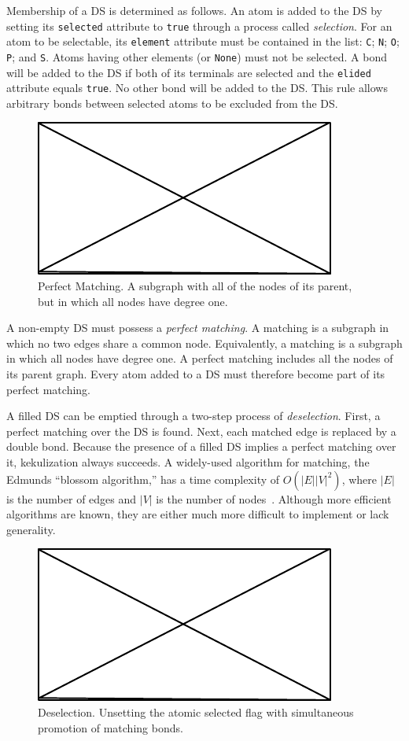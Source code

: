 \documentclass{article}
\def\ttt{\texttt}
\begin{document}
Membership of a DS is determined as follows. An atom is added to the DS by setting its \ttt{selected} attribute to \ttt{true} through a process called \textit{selection}. For an atom to be selectable, its \ttt{element} attribute must be contained in the list: \ttt{C}; \ttt{N}; \ttt{O}; \ttt{P}; and \ttt{S}. Atoms having other elements (or \ttt{None}) must not be selected. A bond will be added to the DS if both of its terminals are selected and the \ttt{elided} attribute equals \ttt{true}. No other bond will be added to the DS. This rule allows arbitrary bonds between selected atoms to be excluded from the DS.

\begin{figure}
    \centering
    \includegraphics{filler}
    \caption{Perfect Matching. A subgraph with all of the nodes of its parent, but in which all nodes have degree one.}
    \label{fig:perfect-matching}
\end{figure}

A non-empty DS must possess a \textit{perfect matching}. A matching is a subgraph in which no two edges share a common node. Equivalently, a matching is a subgraph in which all nodes have degree one. A perfect matching includes all the nodes of its parent graph. Every atom added to a DS must therefore become part of its perfect matching.

A filled DS can be emptied through a two-step process of \textit{deselection}. First, a perfect matching over the DS is found. Next, each matched edge is replaced by a double bond. Because the presence of a filled DS implies a perfect matching over it, kekulization always succeeds. A widely-used algorithm for matching, the Edmunds \enquote{blossom algorithm,} has a time complexity of $O(|E||V|^2)$, where $|E|$ is the number of edges and $|V|$ is the number of nodes~\cite{edmonds:1965}. Although more efficient algorithms are known, they are either much more difficult to implement or lack generality.

\begin{figure}
    \centering
    \includegraphics{filler}
    \caption{Deselection. Unsetting the atomic selected flag with simultaneous promotion of matching bonds.}
    \label{fig:deselection}
\end{figure}
\end{document}
